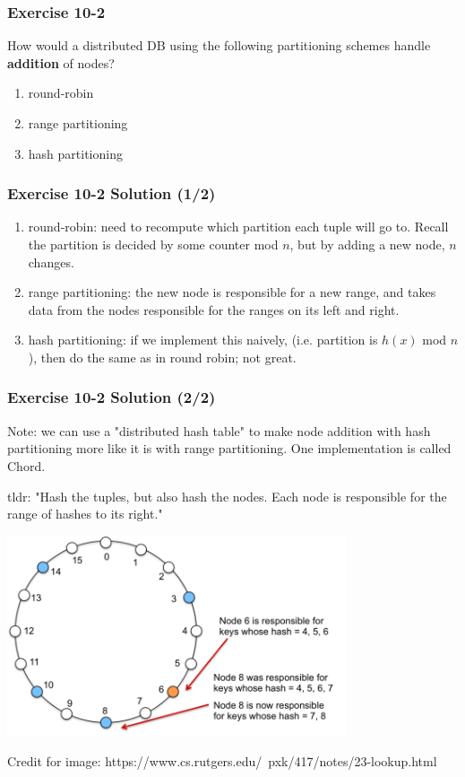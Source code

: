 \begin{frame}
\frametitle{Exercise 10-2}

How would a distributed DB using the following partitioning schemes handle \textbf{addition} of nodes?

\begin{enumerate}
  \item round-robin
  \item range partitioning
  \item hash partitioning
\end{enumerate}

\end{frame}



\begin{frame}
\frametitle{Exercise 10-2 Solution (1/2)}

\begin{enumerate}
  \item round-robin: need to recompute which partition each tuple will go to. Recall the partition is decided by some counter mod $n$, but by adding a new node, $n$ changes.
  \item range partitioning: the new node is responsible for a new range, and takes data from the nodes responsible for the ranges on its left and right.
  \item hash partitioning: if we implement this naively, (i.e. partition is $h(x)$ mod $n$), then do the same as in round robin; not great.
\end{enumerate}

\end{frame}


\begin{frame}
\frametitle{Exercise 10-2 Solution (2/2)}

Note: we can use a "distributed hash table" to make node addition with hash partitioning more like it is with range partitioning. One implementation is called Chord.

tldr: "Hash the tuples, but also hash the nodes. Each node is responsible for the range of hashes to its right."

\begin{center}
  \includegraphics[width=0.75\textwidth]{images/dht-chord-new_node.png}\\
\end{center}

Credit for image: https://www.cs.rutgers.edu/~pxk/417/notes/23-lookup.html

\end{frame}


